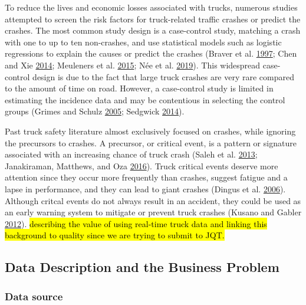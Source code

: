 \documentclass[]{elsarticle} %
\begin{document}
To reduce the lives and economic losses associated with trucks, numerous studies attempted to screen the risk factors for truck-related traffic crashes or predict the crashes. The most common study design is a case-control study, matching a crash with one to up to ten non-crashes, and use statistical models such as logistic regressions to explain the causes or predict the crashes (Braver et al. \protect\hyperlink{ref-braver1997tractor}{1997}; Chen and Xie \protect\hyperlink{ref-chen2014modeling}{2014}; Meuleners et al. \protect\hyperlink{ref-meuleners2015obstructive}{2015}; Née et al. \protect\hyperlink{ref-nee2019road}{2019}). This widespread case-control design is due to the fact that large truck crashes are very rare compared to the amount of time on road. However, a case-control study is limited in estimating the incidence data and may be contentious in selecting the control groups (Grimes and Schulz \protect\hyperlink{ref-grimes2005compared}{2005}; Sedgwick \protect\hyperlink{ref-sedgwick2014case}{2014}).

Past truck safety literature almost exclusively focused on crashes, while ignoring the precursors to crashes. A precursor, or critical event, is a pattern or signature associated with an increasing chance of truck crash (Saleh et al. \protect\hyperlink{ref-saleh2013accident}{2013}; Janakiraman, Matthews, and Oza \protect\hyperlink{ref-janakiraman2016discovery}{2016}). Truck critical events deserve more attention since they occur more frequently than crashes, suggest fatigue and a lapse in performance, and they can lead to giant crashes (Dingus et al. \protect\hyperlink{ref-dingus2006development}{2006}). Although critcal events do not always result in an accident, they could be used as an early warning system to mitigate or prevent truck crashes (Kusano and Gabler \protect\hyperlink{ref-kusano2012safety}{2012}). \hl{describing the value of using real-time truck data and linking this background to quality since we are trying to submit to JQT.}

\hypertarget{data-description-and-the-business-problem}{%
\subsection{Data Description and the Business Problem}\label{data-description-and-the-business-problem}}

\hypertarget{data-source}{%
\subsubsection{Data source}\label{data-source}}
\end{document}
